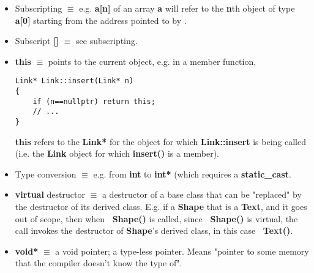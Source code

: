 \documentclass[12pt]{article}
\newcounter{lastnote}
\begin{document}
\begin{itemize}
\item Subscripting $\equiv$ e.g. \textbf{a[n]} of an array \textbf{a} will refer to the \textbf{n}th object of type \textbf{a[0]} starting from the address pointed to by .

\item Subscript \textbf{[]} $\equiv$ see subscripting.

\item \textbf{this} $\equiv$ points to the current object, e.g. in a member function,

\begin{lstlisting}
Link* Link::insert(Link* n)
{
	if (n==nullptr) return this;
	// ...
}
\end{lstlisting}

\textbf{this} refers to the \textbf{Link*} for the object for which \textbf{Link::insert} is being called (i.e. the \textbf{Link} object for which \textbf{insert()} is a member).

\item Type conversion $\equiv$ e.g. from \textbf{int} to \textbf{int*} (which requires a \textbf{static\_cast}.

\item \textbf{virtual} destructor $\equiv$ a destructor of a base class that can be "replaced" by the destructor of its derived class. E.g. if a \textbf{Shape} that is a \textbf{Text}, and it goes out of scope, then when \textbf{~Shape()} is called, since \textbf{~Shape()} is virtual, the call invokes the destructor of \textbf{Shape}'s derived class, in this case \textbf{~Text()}.

\item \textbf{void*} $\equiv$ a void pointer; a type-less pointer. Means "pointer to some memory that the compiler doesn't know the type of".

\end{itemize}










\end{document}

